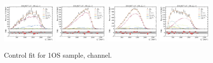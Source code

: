 \begin{figure}[!htb]
    \includegraphics[width=0.24\textwidth]{./figs-fit-fit-results/ctrl-fit/lines_q2_slices/fit_result-lines_q2_idx1-Dst-1os-el.pdf}
    \includegraphics[width=0.24\textwidth]{./figs-fit-fit-results/ctrl-fit/lines_q2_slices/fit_result-lines_q2_idx2-Dst-1os-el.pdf}
    \includegraphics[width=0.24\textwidth]{./figs-fit-fit-results/ctrl-fit/lines_q2_slices/fit_result-lines_q2_idx3-Dst-1os-el.pdf}
    \includegraphics[width=0.24\textwidth]{./figs-fit-fit-results/ctrl-fit/lines_q2_slices/fit_result-lines_q2_idx4-Dst-1os-el.pdf}

    \caption{Control fit for 1OS sample, \Dstar channel.}
    \label{fig:ctrl-1os-dst}
\end{figure}

